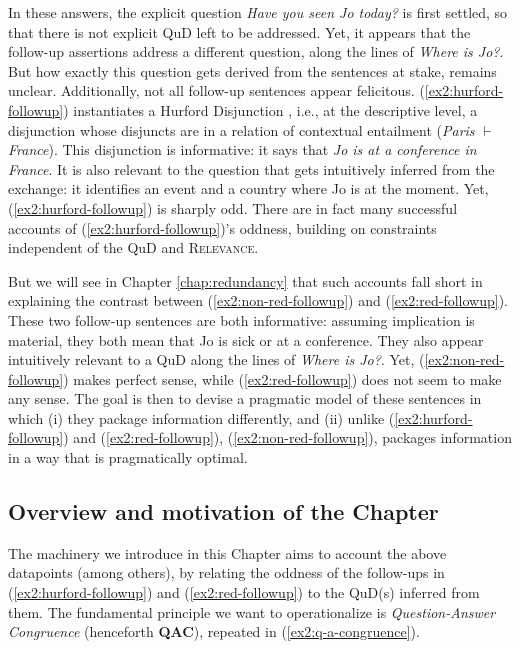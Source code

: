 In these answers, the explicit question \textit{Have you seen Jo today?} is first settled, so that there is not explicit QuD left to be addressed. Yet, it appears that the follow-up assertions address a different question, along the lines of \textit{Where is Jo?}. But how exactly this question gets derived from the sentences at stake, remains unclear. Additionally, not all follow-up sentences appear felicitous. (\ref{ex2:hurford-followup}) instantiates a Hurford Disjunction \citep{Hurford1974}, i.e., at the descriptive level, a disjunction whose disjuncts are in a relation of contextual entailment (\textit{Paris} $\vdash$ \textit{France}). This disjunction is informative: it says that \textit{Jo is at a conference in France}. It is also relevant to the question that gets intuitively inferred from the exchange: it identifies an event and a country where Jo is at the moment. Yet, (\ref{ex2:hurford-followup}) is sharply odd. There are in fact many successful accounts of (\ref{ex2:hurford-followup})'s oddness, building on constraints independent of the QuD and \textsc{Relevance}.

But we will see in Chapter \ref{chap:redundancy} that such accounts fall short in explaining the contrast between (\ref{ex2:non-red-followup}) and (\ref{ex2:red-followup}). These two follow-up sentences are both informative: assuming implication is material, they both mean that Jo is sick or at a conference. They also appear intuitively relevant to a QuD along the lines of \textit{Where is Jo?}. Yet, (\ref{ex2:non-red-followup}) makes perfect sense, while (\ref{ex2:red-followup}) does not seem to make any sense. The goal is then to devise a pragmatic model of these sentences in which (i) they package information differently, and (ii) unlike (\ref{ex2:hurford-followup}) and (\ref{ex2:red-followup}), (\ref{ex2:non-red-followup}), packages information in a way that is pragmatically optimal.

\subsection{Overview  and motivation of the Chapter}
The machinery we introduce in this Chapter aims to account the above datapoints (among others), by relating the oddness of the follow-ups in (\ref{ex2:hurford-followup}) and (\ref{ex2:red-followup}) to the QuD(s) inferred from them. The fundamental principle we want to operationalize is \textit{Question-Answer Congruence} (henceforth \textbf{QAC}), repeated in (\ref{ex2:q-a-congruence}). 

